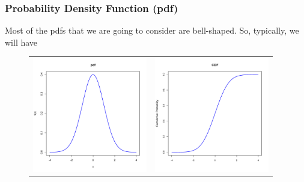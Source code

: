 \documentclass[notes=show,smaller,handout]{beamer}
\begin{document}
\begin{frame}%

\frametitle{Probability Density Function (pdf)}

Most of the pdfs that we are going to consider are bell-shaped. So, typically, we will have 
\begin{figure}[h]
\begin{center}
\begin{tabular}{cc}
\includegraphics[width=5cm, height=5.cm]{R_bell_pdf} & \includegraphics[width=5cm, height=5cm]{R_bell_CDF.pdf} \\
\end{tabular}
\end{center}
\par
\end{figure}


\end{frame}%
\end{document}
